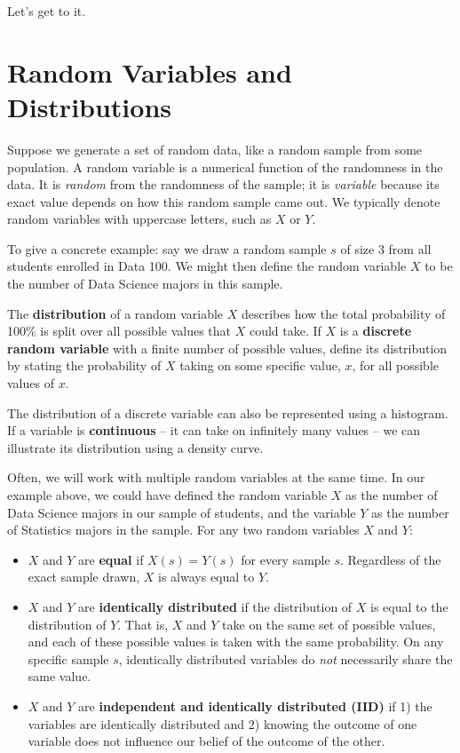 \documentclass[
  letterpaper,
  DIV=11,
  numbers=noendperiod]{scrreprt}
\providecommand{\tightlist}{%
  \setlength{\itemsep}{0pt}\setlength{\parskip}{0pt}}\usepackage{longtable,booktabs,array}
\begin{document}
Let's get to it.

\hypertarget{random-variables-and-distributions}{%
\section{Random Variables and
Distributions}\label{random-variables-and-distributions}}

Suppose we generate a set of random data, like a random sample from some
population. A random variable is a numerical function of the randomness
in the data. It is \emph{random} from the randomness of the sample; it
is \emph{variable} because its exact value depends on how this random
sample came out. We typically denote random variables with uppercase
letters, such as \(X\) or \(Y\).

To give a concrete example: say we draw a random sample \(s\) of size 3
from all students enrolled in Data 100. We might then define the random
variable \(X\) to be the number of Data Science majors in this sample.

The \textbf{distribution} of a random variable \(X\) describes how the
total probability of 100\% is split over all possible values that \(X\)
could take. If \(X\) is a \textbf{discrete random variable} with a
finite number of possible values, define its distribution by stating the
probability of \(X\) taking on some specific value, \(x\), for all
possible values of \(x\).

The distribution of a discrete variable can also be represented using a
histogram. If a variable is \textbf{continuous} -- it can take on
infinitely many values -- we can illustrate its distribution using a
density curve.

Often, we will work with multiple random variables at the same time. In
our example above, we could have defined the random variable \(X\) as
the number of Data Science majors in our sample of students, and the
variable \(Y\) as the number of Statistics majors in the sample. For any
two random variables \(X\) and \(Y\):

\begin{itemize}
\tightlist
\item
  \(X\) and \(Y\) are \textbf{equal} if \(X(s) = Y(s)\) for every sample
  \(s\). Regardless of the exact sample drawn, \(X\) is always equal to
  \(Y\).
\item
  \(X\) and \(Y\) are \textbf{identically distributed} if the
  distribution of \(X\) is equal to the distribution of \(Y\). That is,
  \(X\) and \(Y\) take on the same set of possible values, and each of
  these possible values is taken with the same probability. On any
  specific sample \(s\), identically distributed variables do \emph{not}
  necessarily share the same value.
\item
  \(X\) and \(Y\) are \textbf{independent and identically distributed
  (IID)} if 1) the variables are identically distributed and 2) knowing
  the outcome of one variable does not influence our belief of the
  outcome of the other.
\end{itemize}
\end{document}
